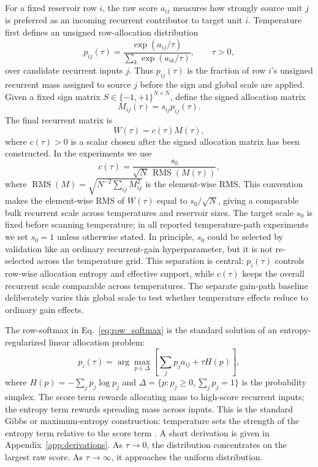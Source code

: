 \documentclass[11pt,a4paper]{article}
\begin{document}
For a fixed reservoir row $i$, the raw score $a_{ij}$ measures how strongly source unit $j$ is preferred as an incoming recurrent contributor to target unit $i$. Temperature first defines an unsigned row-allocation distribution
\begin{equation}
  p_{ij}(\tau)=\frac{\exp(a_{ij}/\tau)}{\sum_k \exp(a_{ik}/\tau)},\qquad \tau>0,
  \label{eq:row_softmax}
\end{equation}
over candidate recurrent inputs $j$. Thus $p_{ij}(\tau)$ is the fraction of row $i$'s unsigned recurrent mass assigned to source $j$ before the sign and global scale are applied. Given a fixed sign matrix $S\in\{-1,+1\}^{N\times N}$, define the signed allocation matrix
\begin{equation}
  M_{ij}(\tau)=s_{ij}p_{ij}(\tau).
  \label{eq:signed_allocation}
\end{equation}
The final recurrent matrix is
\begin{equation}
  W(\tau)=c(\tau)M(\tau),
  \label{eq:scaled_recurrent_matrix}
\end{equation}
where $c(\tau)>0$ is a scalar chosen after the signed allocation matrix has been constructed. In the experiments we use
\begin{equation}
  c(\tau)=\frac{s_0}{\sqrt{N}\,\operatorname{RMS}(M(\tau))},
  \label{eq:scale_normalization}
\end{equation}
where $\operatorname{RMS}(M)=\sqrt{N^{-2}\sum_{ij}M_{ij}^2}$ is the element-wise RMS. This convention makes the element-wise RMS of $W(\tau)$ equal to $s_0/\sqrt{N}$, giving a comparable bulk recurrent scale across temperatures and reservoir sizes. The target scale $s_0$ is fixed before scanning temperature; in all reported temperature-path experiments we set $s_0=1$ unless otherwise stated. In principle, $s_0$ could be selected by validation like an ordinary recurrent-gain hyperparameter, but it is not re-selected across the temperature grid. This separation is central: $p_i(\tau)$ controls row-wise allocation entropy and effective support, while $c(\tau)$ keeps the overall recurrent scale comparable across temperatures. The separate gain-path baseline deliberately varies this global scale to test whether temperature effects reduce to ordinary gain effects.

The row-softmax in Eq.~\eqref{eq:row_softmax} is the standard solution of an entropy-regularized linear allocation problem:
\begin{equation}
  p_i(\tau)=\arg\max_{p\in\Delta}\left[\sum_j p_j a_{ij}+\tau H(p)\right],
  \label{eq:entropy_regularized_allocation}
\end{equation}
where $H(p)=-\sum_j p_j\log p_j$ and $\Delta=\{p:p_j\ge 0,\sum_j p_j=1\}$ is the probability simplex. The score term rewards allocating mass to high-score recurrent inputs; the entropy term rewards spreading mass across inputs. This is the standard Gibbs or maximum-entropy construction: temperature sets the strength of the entropy term relative to the score term \citep{jaynes1957information}. A short derivation is given in Appendix~\ref{app:derivations}. As $\tau\rightarrow 0$, the distribution concentrates on the largest raw score. As $\tau\rightarrow\infty$, it approaches the uniform distribution.
\end{document}
